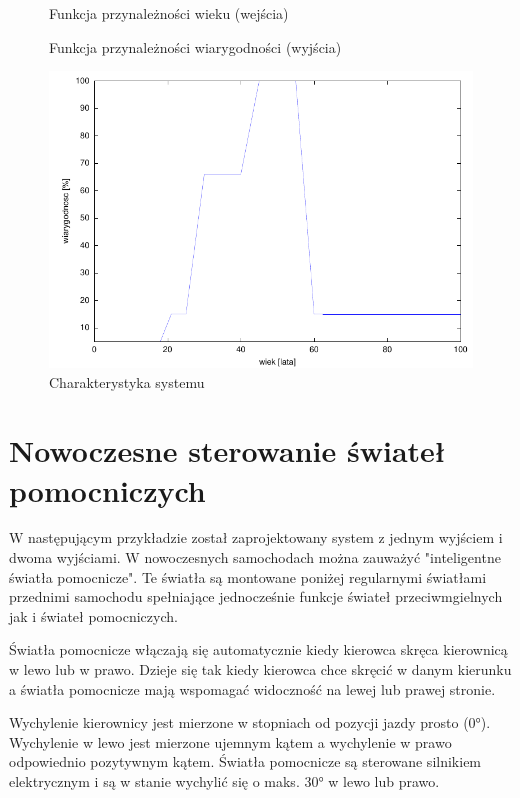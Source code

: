 \begin{figure}[!h]
\centering

\caption{\label{fig:funkcja_we}Funkcja przynależności wieku (wejścia)}
\end{figure}

\begin{figure}[!h]
\centering

\caption{\label{fig:funkcja_wy}Funkcja przynależności wiarygodności (wyjścia)}
\end{figure}

\begin{figure}[!h]
\centering
\includegraphics[scale=1.0]{src/char_wiarygodnosc.pdf}\caption{\label{fig:dane1}Charakterystyka systemu}
\end{figure}

\clearpage
\section{Nowoczesne sterowanie świateł pomocniczych}
W następującym przykładzie został zaprojektowany system z jednym wyjściem i dwoma wyjściami. W nowoczesnych samochodach można zauważyć "inteligentne światła pomocnicze". Te światła są montowane poniżej regularnymi światłami przednimi samochodu spełniające jednocześnie funkcje świateł przeciwmgielnych jak i świateł pomocniczych.

Światła pomocnicze włączają się automatycznie kiedy kierowca skręca kierownicą w lewo lub w prawo. Dzieje się tak kiedy kierowca chce skręcić w danym kierunku a światła pomocnicze mają wspomagać widoczność na lewej lub prawej stronie.

Wychylenie kierownicy jest mierzone w stopniach od pozycji jazdy prosto (0°). Wychylenie w lewo jest mierzone ujemnym kątem a wychylenie w prawo odpowiednio pozytywnym kątem. Światła pomocnicze są sterowane silnikiem elektrycznym i są w stanie wychylić się o maks. 30° w lewo lub prawo.

